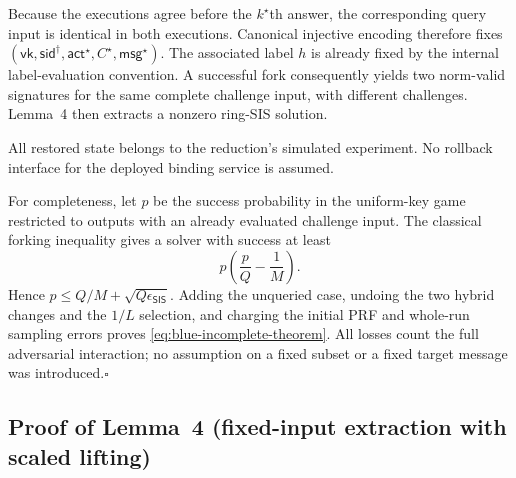 \documentclass[lettersize,journal]{IEEEtran}
\begin{document}
Because the executions agree before the $k^\star$th answer,
the corresponding query input is identical in both executions.
Canonical injective encoding therefore fixes
$(\mathsf{vk},\mathsf{sid}^{\dagger},
  \mathsf{act}^{\star},C^{\star},\mathsf{msg}^{\star})$.
The associated label $h$ is already fixed by the internal
label-evaluation convention.
A successful fork consequently yields two norm-valid signatures
for the same complete challenge input, with different challenges.
Lemma~4 then extracts a nonzero ring-SIS solution.

All restored state belongs to the reduction's simulated experiment.
No rollback interface for the deployed binding service is assumed.

For completeness, let $p$ be the success probability in the uniform-key
game restricted to outputs with an already evaluated challenge input.
The classical forking inequality
gives a solver with success at least
\[
p\left(\frac pQ-\frac1M\right).
\]
Hence $p\leq Q/M+\sqrt{Q\epsilon_{\mathsf{SIS}}}$. Adding the unqueried
case, undoing the two hybrid changes and the $1/L$ selection, and charging
the initial PRF and whole-run sampling errors proves
\eqref{eq:blue-incomplete-theorem}. All losses count the full adversarial
interaction; no assumption on a fixed subset or a fixed target message was
introduced.\hfill$\square$

\subsection{Proof of Lemma~4 (fixed-input extraction with scaled lifting)}
\label{app:talon-lemma4-proof}
\end{document}
